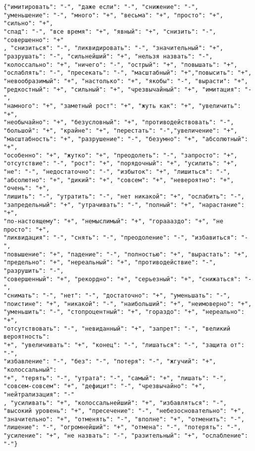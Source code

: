 \begin{lstlisting}[caption="Словосочетания используемые для составления тональных префиксов", label={lst:tonePrefixes}]
{"имитировать": "-", "даже если": "-", "снижение": "-",
"уменьшение": "-", "много": "+", "весьма": "+", "просто": "+", "сильно": "+",
"спад": "-", "все время": "+", "явный": "+", "снизить": "-", "совершенно": "+"
, "снизиться": "-", "ликвидировать": "-", "значительный": "+",
"разрушать": "-", "сильнейший": "+", "нельзя назвать": "-",
"колоссально": "+", "ничего": "-", "острый": "+", "повышать": "+",
"ослаблять": "-", "пресекать": "-", "масштабный": "+","повысить": "+",
"невообразимый": "+", "настолько": "+", "якобы": "-", "вырасти": "+",
"редкостный": "+", "сильный": "+", "чрезвычайный": "+", "имитация": "-",
"намного": "+", "заметный рост": "+", "жуть как": "+", "увеличить": "+",
"необычайно": "+", "безусловный": "+", "противодействовать": "-",
"большой": "+", "крайне": "+", "перестать": "-","увеличение": "+",
"масштабность": "+", "разрушение": "-", "безумно": "+", "абсолютный": "+",
"особенно": "+", "жутко": "+", "преодолеть": "-", "запросто": "+",
"отсутствие": "-", "рост": "+", "порядочный": "+", "усилить": "+",
"не": "-", "недостаточно": "-", "избыток": "+", "лишиться": "-",
"абсолютно": "+", "дикий": "+", "совсем": "+", "невероятно": "+", "очень": "+",
"лишить": "-", "утратить": "-", "нет никакой": "+", "ослабить": "-",
"запредельный": "+", "утрачивать": "-", "полный": "+", "нарастание": "+",
"по-настоящему": "+", "немыслимый": "+", "гораааздо": "+", "не просто": "+",
"ликвидация": "-", "снять": "-", "преодоление": "-", "избавиться": "-",
"повышение": "+", "падение": "-", "полностью": "+", "вырастать": "+",
"предельно": "+", "нереальный": "+", "противодействие": "-", "разрушить": "-",
"совершенный": "+", "рекордно": "+", "серьезный": "+", "снижаться": "-",
"снимать": "-", "нет": "-", "достаточно": "+", "уменьшать": "-",
"поистине": "+", "никакой": "-", "наибольший": "+", "неимоверно": "+",
"уменьшить": "-", "стопроцентный": "+", "гораздо": "+", "нереально": "+",
"отсутствовать": "-", "невиданный": "+", "запрет": "-", "великий вероятность":
"+", "увеличивать": "+", "конец": "-", "лишаться": "-", "защита от": "-",
"избавление": "-", "без": "-", "потеря": "-", "жгучий": "+", "колоссальный":
"+", "терять": "-", "утрата": "-", "самый": "+", "лишать": "-",
"совсем-совсем": "+", "дефицит": "-", "чрезвычайно": "+", "нейтрализация": "-"
, "усиливать": "+", "колоссальнейший": "+", "избавляться": "-",
"высокий уровень": "+", "пресечение": "-", "небезосновательно": "+",
"значительно": "+", "отменять": "-", "вполне": "+", "отменить": "-",
"лишение": "-", "огромнейший": "+", "отмена": "-", "потерять": "-",
"усиление": "+", "не назвать": "-", "разительный": "+", "ослабление": "-"}
\end{lstlisting}
